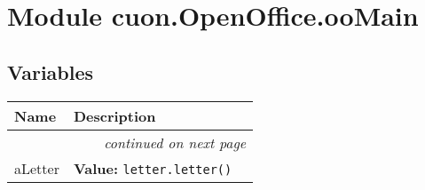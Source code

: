 %
%
%


\section{Module cuon.OpenOffice.ooMain}

    \label{cuon:OpenOffice:ooMain}


  \subsection{Variables}

    \vspace{-1cm}
\hspace{\varindent}\begin{longtable}{|p{\varnamewidth}|p{\vardescrwidth}|l}
\cline{1-2}
\cline{1-2} \centering \textbf{Name} & \centering \textbf{Description}& \\
\cline{1-2}
\endhead\cline{1-2}\multicolumn{3}{r}{\small\textit{continued on next page}}\\\endfoot\cline{1-2}
\endlastfoot\raggedright a\-L\-e\-t\-t\-e\-r\- & \raggedright \textbf{Value:} 
{\tt letter.letter()}&\\
\cline{1-2}
\end{longtable}

